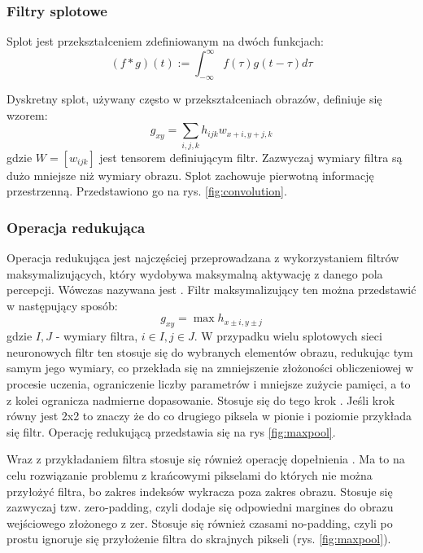 \subsubsection{Filtry splotowe}
\label{sec:convolutionalFilters}
Splot jest przekształceniem zdefiniowanym na dwóch funkcjach:
\[(f*g)(t):=\int_{-\infty}^{\infty}f(\tau)g(t-\tau)d\tau\]
\par
Dyskretny splot, używany często w przekształceniach obrazów, definiuje się wzorem\cite{matematyk2022-fh}:
\[g_{xy}=\sum_{i,j,k}h_{ijk}w_{x+i,y+j,k}\]
gdzie 
$W=[w_{ijk}]$ jest tensorem definiującym filtr. Zazwyczaj wymiary filtra są dużo mniejsze niż wymiary obrazu. Splot zachowuje pierwotną informację przestrzenną. Przedstawiono go na rys. \ref{fig:convolution}.


\subsubsection{Operacja redukująca}
Operacja redukująca  jest najczęściej przeprowadzana z wykorzystaniem filtrów maksymalizujących, który wydobywa maksymalną aktywację z danego pola percepcji. Wówczas nazywana jest . Filtr maksymalizujący ten można przedstawić w następujący sposób:
\[g_{xy}=\max{h_{x \pm i, y \pm j}}\]
gdzie $I,J$ - wymiary filtra, $i \in I, j \in J$. W przypadku wielu splotowych sieci neuronowych filtr ten stosuje się do wybranych elementów obrazu, redukując tym samym jego wymiary, co przekłada się na zmniejszenie złożoności obliczeniowej w procesie uczenia, ograniczenie liczby parametrów i mniejsze zużycie pamięci, a to z kolei ogranicza nadmierne dopasowanie. Stosuje się do tego krok . Jeśli krok równy jest 2x2 to znaczy że do co drugiego piksela w pionie i poziomie przykłada się filtr. 
Operację redukującą przedstawia się na rys \ref{fig:maxpool}.
\par
Wraz z przykładaniem filtra stosuje się również operację dopełnienia . Ma to na celu rozwiązanie problemu z krańcowymi pikselami do których nie można przyłożyć filtra, bo zakres indeksów wykracza poza zakres obrazu. Stosuje się zazwyczaj tzw. zero-padding, czyli dodaje się odpowiedni margines do obrazu wejściowego złożonego z zer. Stosuje się również czasami no-padding, czyli po prostu ignoruje się przyłożenie filtra do skrajnych pikseli (rys. \ref{fig:maxpool}).




